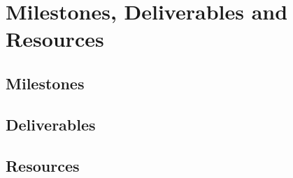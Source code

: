 \chapter{Milestones, Deliverables and Resources}

\section{Milestones}

\section{Deliverables}

\section{Resources}
